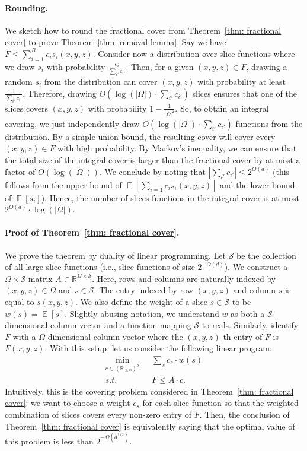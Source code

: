 \documentclass[11pt]{article}
\DeclareMathOperator*{\E}{\mathbb{E}}
\newcommand{\1}{ \mathbbm{1}}
\begin{document}
\paragraph*{Rounding.} We sketch how to round the fractional cover from Theorem~\ref{thm: fractional cover} to prove Theorem~\ref{thm: removal lemma}. Say we have $F\le \sum_{i=1}^R c_i s_i(x,y,z)$. Consider now a distribution over slice functions where we draw $s_i$ with probability $\frac{c_i}{\sum_{i'}c_{i'}}$. Then, for a given $(x,y,z)\in F$, drawing a random $s_i$ from the distribution can cover $(x,y,z)$ with probability at least $\frac{1}{\sum_{i'}c_{i'}}$. Therefore, drawing $O(\log(|\Omega|)\cdot \sum_{i'}c_{i'})$ slices ensures that one of the slices covers $(x,y,z)$ with probability $1 - \frac{1}{|\Omega|^2}$. So, to obtain an integral covering, we just independently draw $O(\log(|\Omega|)\cdot \sum_{i'}c_{i'})$ functions from the distribution. By a simple union bound, the resulting cover will cover every $(x,y,z)\in F$ with high probability. By Markov's inequality, we can ensure that the total size of the integral cover is larger than the fractional cover by at most a factor of $O(\log(|\Omega|))$. We conclude by noting that $|\sum_{i'} c_{i'}| \le 2^{O(d)}$ (this follows from the upper bound of $\E\left[\sum_{i=1} c_i s_i(x,y,z) \right]$ and the lower bound of $\E[s_i]$). Hence, the number of slices functions in the integral cover is at most $2^{O(d)}\cdot \log(|\Omega|)$.

\paragraph*{Proof of Theorem~\ref{thm: fractional cover}.} We prove the theorem by duality of linear programming. Let $\mathcal{S}$ be the collection of all large slice functions (i.e., slice functions of size $2^{-O(d)}$). We construct a $\Omega\times \mathcal{S}$ matrix $A\in \mathbb{R}^{\Omega \times \mathcal{S}}$. Here, rows and columns are naturally indexed by $(x,y,z)\in \Omega$ and $s\in \mathcal{S}$. The entry indexed by row $(x,y,z)$ and column $s$ is equal to $s(x,y, z)$. We also define the weight of a slice $s\in \mathcal{S}$ to be $w(s) = \E[s]$. Slightly abusing notation, we understand $w$ as both a $\mathcal{S}$-dimensional column vector and a function mapping $\mathcal{S}$ to reals. Similarly, identify $F$ with a $\Omega$-dimensional column vector where the $(x,y,z)$-th entry of $F$ is $F(x,y,z)$. With this setup, let us consider the following linear program:
$$
\begin{aligned}
\min_{c\in (\mathbb{R}_{\ge 0})^{\mathcal{S}}} ~~~& \sum_{s} c_s \cdot w(s) \\
s.t. ~~~~& F \le A\cdot c.
\end{aligned}
$$
Intuitively, this is the covering problem considered in Theorem~\ref{thm: fractional cover}: we want to choose a weight $c_s$ for each slice function so that the weighted combination of slices covers every non-zero entry of $F$. Then, the conclusion of Theorem~\ref{thm: fractional cover} is equivalently saying that the optimal value of this problem is less than $2^{-\Omega(d^{1/2})}$.
\end{document}
